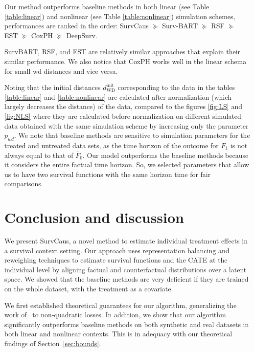 \documentclass[12pt]{article}
\theoremstyle{plain}
\theoremstyle{definition}
\theoremstyle{remark}
\begin{document}
Our method outperforms baseline methods in both linear (see Table \ref{table:linear}) and nonlinear (see Table \ref{table:nonlinear}) simulation schemes, performances are ranked in the order: SurvCaus $\succeq $  Surv-BART $\succeq $ RSF $\succeq $  EST $\succeq $  CoxPH $\succeq $  DeepSurv.

SurvBART, RSF, and EST are relatively similar approaches that explain their similar performance. We also notice that CoxPH works well in the linear schema for small wd distances and vice versa.

Noting that the initial distances $d_{\text{WD}}^{\text{init}}$ corresponding to the data in the tables  \ref{table:linear} and \ref{table:nonlinear} are calculated after normalization (which largely decreases the distance) of the data, compared to the figures \ref{fig:LS} and \ref{fig:NLS} where they are calculated before normalization on different simulated data obtained with the same simulation scheme by increasing only the parameter $p_{wd}$. We note that baseline methods are sensitive to simulation parameters for the treated and untreated data sets, as the time horizon of the outcome for $\bar{F}_1$ is not always equal to that of $\bar{F}_0$. Our model outperforms the baseline methods because it considers the entire factual time horizon. So, we selected parameters that allow us to have two survival functions with the same horizon time for fair comparisons. 


\section{Conclusion and discussion }
We present SurvCaus, a novel method to estimate individual treatment effects in a survival context setting. Our approach uses representation balancing and reweighing techniques to estimate survival functions and the CATE at the individual level by aligning factual and counterfactual distributions over a latent space.
We showed that the baseline methods are very deficient if they are trained on the whole dataset, with the treatment as a covariate. 

We first established theoretical guarantees for our algorithm, generalizing the work of~\cite{johansson2020generalization} to non-quadratic losses. In addition, we show that our algorithm significantly outperforms baseline methods on both synthetic and real datasets in both linear and nonlinear contexts. This is in adequacy with our theoretical findings of Section~\ref{sec:bounds}. 
\end{document}
